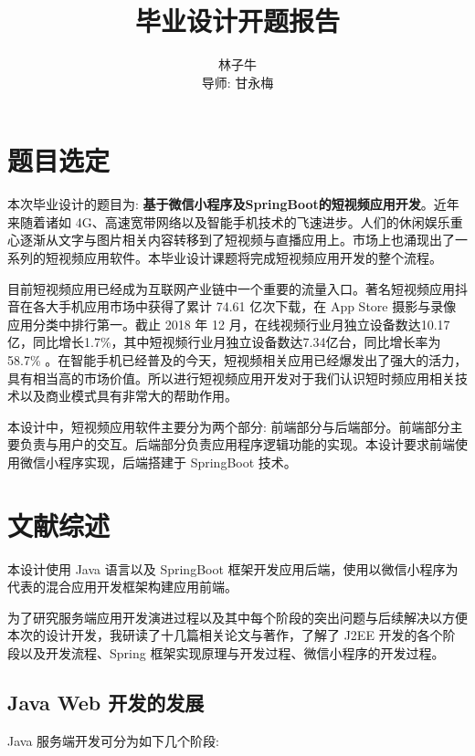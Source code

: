 \documentclass[a4paper, 12pt, UTF8]{ctexart}
\author{\kaishu 林子牛 \\ \kaishu 导师: 甘永梅}
\title{\heiti 毕业设计开题报告}
\date{}
\begin{document}
	\maketitle
	\tableofcontents
	\newpage
	\section{题目选定}
	本次毕业设计的题目为: \textbf{基于微信小程序及SpringBoot的短视频应用开发}。近年来随着诸如 4G、高速宽带网络以及智能手机技术的飞速进步。人们的休闲娱乐重心逐渐从文字与图片相关内容转移到了短视频与直播应用上。市场上也涌现出了一系列的短视频应用软件。本毕业设计课题将完成短视频应用开发的整个流程。
	
	目前短视频应用已经成为互联网产业链中一个重要的流量入口。著名短视频应用抖音在各大手机应用市场中获得了累计 74.61 亿次下载，在 App Store 摄影与录像应用分类中排行第一。截止 2018 年 12 月，在线视频行业月独立设备数达10.17亿，同比增长1.7\%，其中短视频行业月独立设备数达7.34亿台，同比增长率为58.7\% \cite{2019}。在智能手机已经普及的今天，短视频相关应用已经爆发出了强大的活力，具有相当高的市场价值。所以进行短视频应用开发对于我们认识短时频应用相关技术以及商业模式具有非常大的帮助作用。
	
	本设计中，短视频应用软件主要分为两个部分: 前端部分与后端部分。前端部分主要负责与用户的交互。后端部分负责应用程序逻辑功能的实现。本设计要求前端使用微信小程序实现，后端搭建于 SpringBoot 技术。
	
	\section{文献综述}
	本设计使用 Java 语言以及 SpringBoot 框架开发应用后端，使用以微信小程序为代表的混合应用开发框架构建应用前端。
	
	为了研究服务端应用开发演进过程以及其中每个阶段的突出问题与后续解决以方便本次的设计开发，我研读了十几篇相关论文与著作，了解了 J2EE 开发的各个阶段以及开发流程、Spring 框架实现原理与开发过程、微信小程序的开发过程。
	\subsection{Java Web 开发的发展}
	
	Java 服务端开发可分为如下几个阶段:
	
\end{document}
